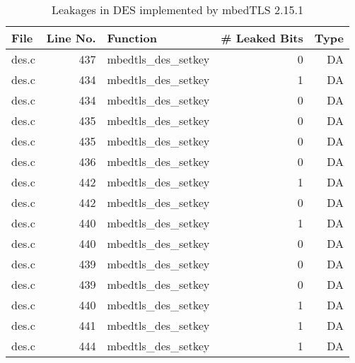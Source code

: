 \begin{table}[h!]
\centering\tiny\scriptsize
\caption{Leakages in DES implemented by mbedTLS 2.15.1}\label{tab:DESmbedTLS2.15.1}
\begin{tabular}{lrlrr}
\hline
\textbf{File} & \textbf{Line No.} & \textbf{Function} & \textbf{\# Leaked Bits} & \textbf{Type} \\\hline
des.c& 437&mbedtls\_des\_setkey&0 &DA\\
des.c& 434&mbedtls\_des\_setkey&1 &DA\\
des.c& 434&mbedtls\_des\_setkey&0 &DA\\
des.c& 435&mbedtls\_des\_setkey&0 &DA\\
des.c& 435&mbedtls\_des\_setkey&0 &DA\\
des.c& 436&mbedtls\_des\_setkey&0 &DA\\
des.c& 442&mbedtls\_des\_setkey&1 &DA\\
des.c& 442&mbedtls\_des\_setkey&0 &DA\\
des.c& 440&mbedtls\_des\_setkey&1 &DA\\
des.c& 440&mbedtls\_des\_setkey&0 &DA\\
des.c& 439&mbedtls\_des\_setkey&0 &DA\\
des.c& 439&mbedtls\_des\_setkey&0 &DA\\
des.c& 440&mbedtls\_des\_setkey&1 &DA\\
des.c& 441&mbedtls\_des\_setkey&1 &DA\\
des.c& 444&mbedtls\_des\_setkey&1 &DA\\
\hline
\end{tabular}
\renewcommand{\baselinestretch}{1.0}\selectfont
\end{table}
